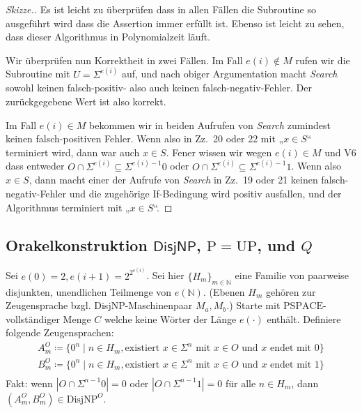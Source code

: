 \documentclass[nofonts]{uebung}
\def\P{\ensuremath{\mathrm{P}}}
\def\UP{\ensuremath{\mathrm{UP}}}
\def\DisjNP{\ensuremath{\mathrm{DisjNP}}}
\def\hDisjNP{\ensuremath{\mathsf{DisjNP}}}
\begin{document}
\begin{proof}[Skizze.]
    Es ist leicht zu überprüfen dass in allen Fällen die Subroutine so ausgeführt wird dass die Assertion immer erfüllt ist.
    Ebenso ist leicht zu sehen, dass dieser Algorithmus in Polynomialzeit läuft.

    Wir überprüfen nun Korrektheit in zwei Fällen.
    Im Fall $e(i)\not\in M$ rufen wir die Subroutine mit $U=\Sigma^{e(i)}$ auf, und nach obiger Argumentation macht \emph{Search} sowohl keinen falsch-positiv- also auch keinen falsch-negativ-Fehler.
    Der zurückgegebene Wert ist also korrekt.

    Im Fall $e(i)\in M$ bekommen wir in beiden Aufrufen von \emph{Search} zumindest keinen falsch-positiven Fehler. Wenn also in Zz.~20 oder 22 mit „$x\in S$“ terminiert wird, dann war auch $x\in S$.
    Fener wissen wir wegen $e(i)\in M$ und V6 dass entweder $O\cap\Sigma^{e(i)}\subseteq \Sigma^{e(i)-1}0$ oder $O\cap\Sigma^{e(i)}\subseteq \Sigma^{e(i)-1}1$.
    Wenn also $x\in S$, dann macht einer der Aufrufe von \emph{Search} in Zz.~19 oder 21 keinen falsch-negativ-Fehler und die zugehörige If-Bedingung wird positiv ausfallen, und der Algorithmus terminiert mit „$x\in S$“.
\end{proof}

\clearpage
\subsection*{Orakelkonstruktion $\hDisjNP$, $\P=\UP$, und $Q$}
\setcounter{theorem}{0}

Sei $e(0)=2, e(i+1)=2^{2^{e(i)}}$. Sei hier $\{H_m\}_{m\in\mathbb N}$ eine Familie von paarweise disjunkten, unendlichen Teilmenge von $e(\mathbb N)$. (Ebenen $H_m$ gehören zur Zeugensprache bzgl. DisjNP-Maschinenpaar $M_a, M_b$.)
Starte mit $\mathrm{PSPACE}$-vollständiger Menge $C$ welche keine Wörter der Länge $e(\cdot)$ enthält.
Definiere folgende Zeugensprachen:
        \begin{gather*}
            A_m^O \coloneqq \{ 0^n \mid n\in H_m, \text{existiert $x\in \Sigma^{n}$ mit } x\in O \text{ und $x$ endet mit $0$} \}\\
            B_m^O \coloneqq \{ 0^n \mid n\in H_m, \text{existiert $x\in \Sigma^{n}$ mit } x\in O \text{ und $x$ endet mit $1$} \}\\
        \end{gather*}
        Fakt: wenn $|O\cap \Sigma^{n-1}0|=0$ oder $|O\cap \Sigma^{n-1}1|=0$ für alle $n\in H_m$, dann $(A_m^O, B_m^O)\in\DisjNP^O$.\\
\medskip
\end{document}
